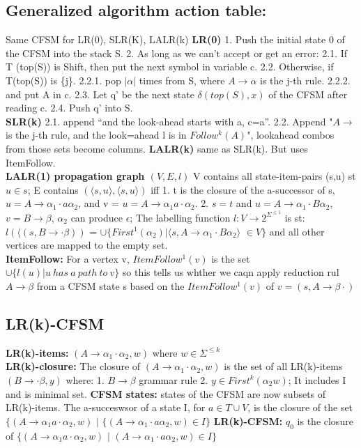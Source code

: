 \subsection*{Generalized algorithm action table:}
Same CFSM for LR(0), SLR(K), LALR(k)
\textbf{LR(0)} 1. Push the initial state 0 of the CFSM into the stack S. 2. As long as we can’t accept or get an error: 2.1. If T (top(S)) is Shift, then put the next symbol in variable c. 2.2. Otherwise, if T(top(S)) is \{j\}. 2.2.1. pop $|\alpha|$ times from S, where $A \rightarrow \alpha$ is the j-th rule. 2.2.2. and put A in c. 2.3. Let q' be the next state $\delta (top(S),x)$ of the CFSM after reading c. 2.4. Push  q' into S.\\
\textbf{SLR(k)} 2.1. append ``and the look-ahead starts with a, c=a''. 2.2. Append "$A \rightarrow$ is the j-th rule, and the look=ahead l is in $Follow^k(A)$", lookahead combos from those sets become columns.
\textbf{LALR(k)} same as SLR(k). But uses ItemFollow.\\
\textbf{LALR(1) propagation graph $(V,E,l)$} V contains all state-item-pairs (s,u) st $u \in s$; E contains $(\langle s,u\rangle, \langle s,u\rangle)$ iff 1. t is the closure of the a-successor of s, $u = A \rightarrow \alpha_1 \cdotp a \alpha_2$, and v = $u = A \rightarrow \alpha_1 a \cdotp \alpha_2$. 2. $s = t$ and $u = A \rightarrow \alpha_1 \cdotp B \alpha_2$, $v = B \rightarrow \beta$, $\alpha_2$ can produce $\epsilon$; The labelling function $l: V \rightarrow 2^{\Sigma^{\leqslant 1}}$ is st: $l(\langle(s,B\rightarrow \cdotp \beta))$ = $\cup \{First^1(\alpha_2)$$| \langle s,A \rightarrow \alpha_1 \cdotp B \alpha_2\rangle$ $\in V\}$ and all other vertices are mapped to the empty set.\\
	\textbf{ItemFollow:} For a vertex v, $ItemFollow^1(v)$ is the set $\cup\{ l(u) | u\ has\ a\ path\ to\ v\}$ so this tells us whther we caqn apply reduction rul $A \rightarrow \beta$ from a CFSM state s based on the $ItemFollow^1(v)$ of $v = (s,A\rightarrow \beta \cdotp)$
	\subsection*{LR(k)-CFSM}
	\textbf{LR(k)-items:} $(A\rightarrow \alpha_1 \cdotp \alpha_2,w)$ where $w\in \Sigma^{\leqslant k}$\\
	\textbf{LR(k)-closure:} The closure of $(A\rightarrow \alpha_1 \cdotp \alpha_2,w)$ is the set of all LR(k)-items $(B \rightarrow \cdotp \beta,y)$ where: 1. $B \rightarrow \beta$ grammar rule 2. $y \in First^k(\alpha_2 w)$; It includes I and is minimal set.
	\textbf{CFSM states:} states of the CFSM are now subsets of LR(k)-items. The a-succeswsor of a state I, for $a \in T\cup V$, is the closure of the set $\{(A\rightarrow \alpha_1 a \cdotp \alpha_2,w)$ $|$ $\{(A\rightarrow \alpha_1 \cdotp a \alpha_2,w) \in I\}$
	\textbf{LR(k)-CFSM:} $q_0$ is the closure of $\{(A\rightarrow \alpha_1 a \cdotp \alpha_2,w)$ $|$ $(A\rightarrow \alpha_1 \cdotp a \alpha_2,w) \in I\}$
